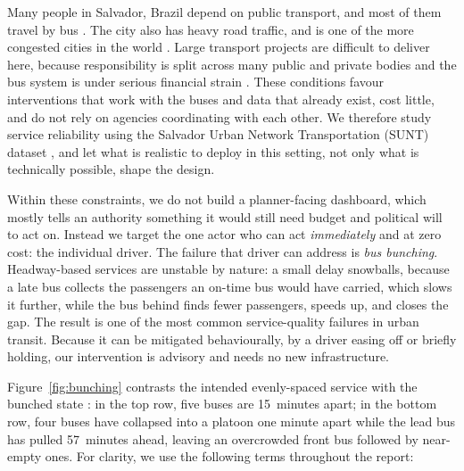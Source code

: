 \documentclass[11pt,a4paper]{article}
\begin{document}
Many people in Salvador, Brazil depend on public transport, and most of them travel by bus
\citep{bndes2025salvador, Ferreira2025}. The city also has heavy road traffic, and is one of the more
congested cities in the world \citep{tomtom2025salvador, tomtom2025ranking}. Large transport projects
are difficult to deliver here, because responsibility is split across many public and private bodies
and the bus system is under serious financial strain \citep{tcebahia2022compensacao,
worldbank2026salvador}. These conditions favour interventions that work with the buses and data that
already exist, cost little, and do not rely on agencies coordinating with each other. We therefore
study service reliability using the Salvador Urban Network Transportation (SUNT) dataset
\citep{Ferreira2025}, and let what is realistic to deploy in this setting, not only what is
technically possible, shape the design.

Within these constraints, we do not build a planner-facing dashboard, which mostly tells an
authority something it would still need budget and political will to act on. Instead we target the
one actor who can act \emph{immediately} and at zero cost: the individual driver. The failure that
driver can address is \emph{bus bunching}. Headway-based services are unstable by nature: a small
delay snowballs, because a late bus collects the passengers an on-time bus would have carried, which
slows it further, while the bus behind finds fewer passengers, speeds up, and closes the gap. The
result is one of the most common service-quality failures in urban transit. Because it can be
mitigated behaviourally, by a driver easing off or briefly holding, our intervention is advisory and
needs no new infrastructure.

Figure~\ref{fig:bunching} contrasts the intended evenly-spaced service with the bunched
state \citep{Enayatollahi2019}: in the top row, five buses are 15~minutes apart; in the
bottom row, four buses have collapsed into a platoon one minute apart while the lead bus
has pulled 57~minutes ahead, leaving an overcrowded front bus followed by near-empty ones.
For clarity, we use the following terms throughout the report:
\end{document}
